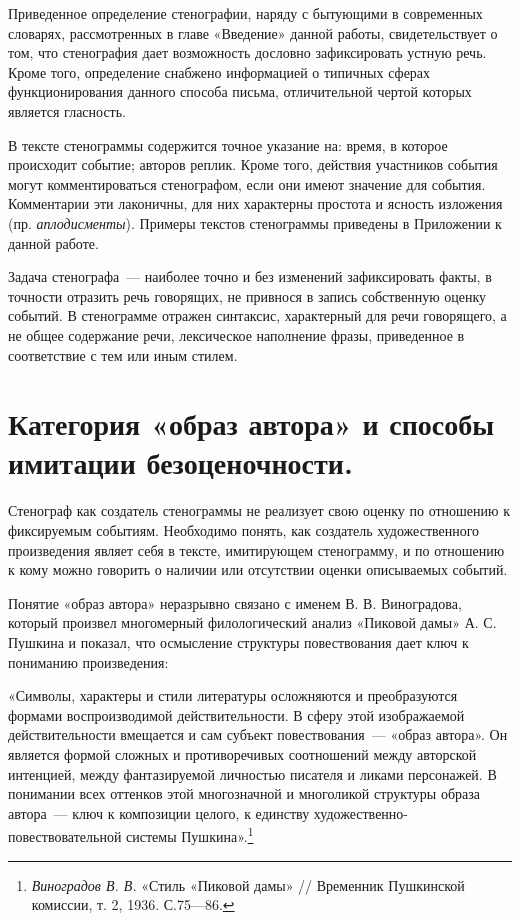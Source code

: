 \documentclass{kursa4}
\begin{document}
       Приведенное определение стенографии, наряду с бытующими в
      современных словарях, рассмотренных в главе «Введение» данной работы,
      свидетельствует о том, что стенография дает возможность дословно
      зафиксировать устную речь. Кроме того, определение снабжено
      информацией о типичных сферах функционирования данного способа
      письма, отличительной чертой которых является гласность. 

      В тексте стенограммы содержится точное указание на: время, в которое
      происходит событие; авторов реплик. Кроме того, действия участников
      события могут комментироваться стенографом, если они имеют значение для
      события. Комментарии эти лаконичны, для них характерны простота и
      ясность изложения (пр. \textit{аплодисменты}). Примеры текстов
      стенограммы приведены в Приложении к данной работе. 

      Задача стенографа~--- наиболее точно и без изменений зафиксировать
      факты, в точности отразить речь говорящих, не привнося в запись
      собственную оценку событий. В стенограмме отражен синтаксис,
      характерный для речи говорящего, а не общее содержание речи,
      лексическое наполнение фразы, приведенное в соответствие с тем или иным
      стилем. 

    \section{Категория «образ автора» и способы
    имитации безоценочности.}

      Стенограф как создатель стенограммы не реализует свою оценку по
      отношению к фиксируемым событиям. Необходимо понять, как создатель
      художественного произведения являет себя в тексте, имитирующем
      стенограмму, и по отношению к кому можно говорить о наличии или
      отсутствии оценки описываемых событий. 

      Понятие «образ автора» неразрывно связано с именем В. В.
      Виноградова, который произвел многомерный филологический анализ
      «Пиковой дамы» А. С. Пушкина и показал, что осмысление структуры
      повествования дает ключ к пониманию произведения:

      «Символы, характеры и стили литературы осложняются и преобразуются
      формами воспроизводимой действительности. В сферу этой изображаемой
      действительности вмещается и сам субъект повествования~--- «образ
      автора». Он является формой сложных и противоречивых соотношений между
      авторской интенцией, между фантазируемой личностью писателя и ликами
      персонажей. В понимании всех оттенков этой многозначной и многоликой
      структуры образа автора~--- ключ к композиции целого, к единству
      художественно-повествовательной системы
      Пушкина».\footnote{\textit{{Виноградов В. В.
      }}{«Стиль «Пиковой дамы» // Временник Пушкинской
      комиссии, т. 2, 1936. С.75—86.}} 
\end{document}
